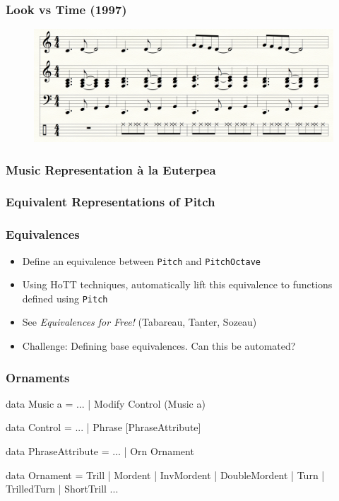 \documentclass{beamer}
\begin{document}
\begin{frame}\frametitle{Look vs Time (1997)}
\begin{figure}
\includegraphics[width=\textwidth]{lookVsTime}
\end{figure}
\end{frame}

\begin{frame}\frametitle{Music Representation \`a la Euterpea}
\end{frame}

\begin{frame}\frametitle{Equivalent Representations of Pitch}
\end{frame}

\begin{frame}\frametitle{Equivalences}
\begin{itemize}
\item Define an equivalence between {\tt Pitch} and {\tt PitchOctave}
\item Using HoTT techniques, automatically lift this equivalence to functions defined using \texttt{Pitch}
\item See \textit{Equivalences for Free!} (Tabareau, Tanter, Sozeau)
\item Challenge: Defining base equivalences. Can this be automated?
\end{itemize}
\end{frame}

\begin{frame}[fragile]\frametitle{Ornaments}
\begin{semiverbatim}
data Music a  = ... 
  |  Modify Control (Music a)

data Control = ...
  |  Phrase [PhraseAttribute]

data PhraseAttribute = ...
  |  Orn Ornament

data Ornament =
  Trill | Mordent | InvMordent | DoubleMordent |
  Turn | TrilledTurn | ShortTrill ...
\end{semiverbatim}
\end{frame}
\end{document}
